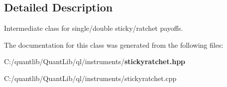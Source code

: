 \subsection{Detailed Description}
Intermediate class for single/double sticky/ratchet payoffs. 

The documentation for this class was generated from the following files\+:\begin{DoxyCompactItemize}
\item 
C\+:/quantlib/\+Quant\+Lib/ql/instruments/{\bf stickyratchet.\+hpp}\item 
C\+:/quantlib/\+Quant\+Lib/ql/instruments/stickyratchet.\+cpp\end{DoxyCompactItemize}
